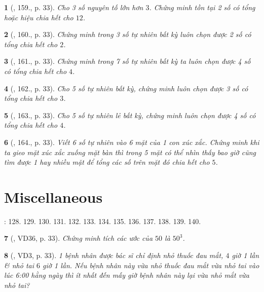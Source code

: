\documentclass{article}
\newtheorem{baitoan}{}
\begin{document}
\begin{baitoan}[\cite{Tuyen_Toan_6}, 159., p. 33]
	Cho 3 số nguyên tố lớn hơn $3$. Chứng minh tồn tại 2 số có tổng hoặc hiệu chia hết cho $12$.
\end{baitoan}

\begin{baitoan}[\cite{Tuyen_Toan_6}, 160., p. 33]
	Chứng minh trong 3 số tự nhiên bất kỳ luôn chọn được 2 số có tổng chia hết cho $2$.
\end{baitoan}

\begin{baitoan}[\cite{Tuyen_Toan_6}, 161., p. 33]
	Chứng minh trong 7 số tự nhiên bất kỳ ta luôn chọn được 4 số có tổng chia hết cho $4$.
\end{baitoan}

\begin{baitoan}[\cite{Tuyen_Toan_6}, 162., p. 33]
	Cho 5 số tự nhiên bất kỳ, chứng minh luôn chọn được 3 số có tổng chia hết cho $3$.
\end{baitoan}

\begin{baitoan}[\cite{Tuyen_Toan_6}, 163., p. 33]
	Cho 5 số tự nhiên lẻ bất kỳ, chứng minh luôn chọn được 4 số có tổng chia hết cho $4$.
\end{baitoan}

\begin{baitoan}[\cite{Tuyen_Toan_6}, 164., p. 33]
	Viết 6 số tự nhiên vào 6 mặt của 1 con xúc xắc. Chứng minh khi ta gieo mặt xúc xắc xuống mặt bàn thì trong 5 mặt có thể nhìn thấy bao giờ cũng tìm được 1 hay nhiều mặt để tổng các số trên mặt đó chia hết cho $5$.
\end{baitoan}


\section{Miscellaneous}
\cite[BTCCI, pp. 37--38]{SBT_Toan_6_Canh_Dieu_tap_1}: 128. 129. 130. 131. 132. 133. 134. 135. 136. 137. 138. 139. 140.

\begin{baitoan}[\cite{Tuyen_Toan_6}, VD36, p. 33]
	Chứng minh tích các ước của $50$ là $50^3$.
\end{baitoan}

\begin{baitoan}[\cite{Tuyen_Toan_6}, VD3, p. 33]
	1 bệnh nhân được bác sĩ chỉ định nhỏ thuốc đau mắt, $4$ giờ 1 lần \& nhỏ tai $6$ giờ 1 lần. Nếu bệnh nhân này vừa nhỏ thuốc đau mắt vừa nhỏ tai vào lúc {\rm6:00} hằng ngày thì ít nhất đến mấy giờ bệnh nhân này lại vừa nhỏ mắt vừa nhỏ tai?
\end{baitoan}
\end{document}
